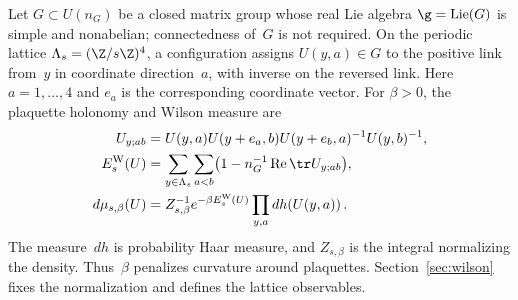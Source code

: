 Let $G\subset U(n_G)$ be a closed matrix group whose real Lie algebra $\g=\operatorname{Lie}(G)$ is simple and nonabelian; connectedness of~$G$ is not required. On the periodic lattice $\Lambda_s=(\Z/s\Z)^4$, a configuration assigns $U(y,a)\in G$ to the positive link from~$y$ in coordinate direction~$a$, with inverse on the reversed link. Here $a=1,\ldots,4$ and $e_a$ is the corresponding coordinate vector. For $\beta>0$, the plaquette holonomy and Wilson measure are
\begin{align*}
U_{y;ab}&=U(y,a)U(y+e_a,b)U(y+e_b,a)^{-1}U(y,b)^{-1},\\
E_s^{\rm W}(U)&=\sum_{y\in\Lambda_s}\sum_{a<b}\bigl(1-n_G^{-1}\operatorname{Re}\tr U_{y;ab}\bigr),\\
d\mu_{s,\beta}(U)&=Z_{s,\beta}^{-1}e^{-\beta E_s^{\rm W}(U)}\prod_{y,a}dh(U(y,a))\,.
\end{align*}
The measure~$dh$ is probability Haar measure, and $Z_{s,\beta}$ is the integral normalizing the density. Thus~$\beta$ penalizes curvature around plaquettes. Section~\ref{sec:wilson} fixes the normalization and defines the lattice observables.

